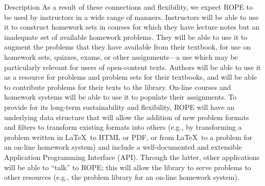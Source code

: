 \documentclass[11pt]{article}
\begin{document}
\begin{section}{Description}
As a result of these connections and flexibility, we expect ROPE to be
used by instructors in a wide range of manners.  Instructors will be able
to use it to construct homework sets in courses for which they have
lecture notes but an inadequate set of available homework problems.  They
will be able to use it to augment the problems that they have available
from their textbook, for use on homework sets, quizzes, exams, or other
assignments---a use which may be particularly relevant for users of
open-content texts.  Authors will be able to use it as a resource for
problems and problem sets for their textbooks, and will be able to
contribute problems for their texts to the library.  On-line courses and
homework systems will be able to use it to populate their assignments.  To
provide for its long-term sustainability and flexibility, ROPE will
have an underlying data structure that will allow the addition of new
problem formats and filters to transform existing formats into others
(e.g., by transforming a problem written in \LaTeX\ to HTML or PDF, or
from \LaTeX\ to a problem for an on-line homework system) and include a
well-documented and extensible Application Programming Interface
(API). Through the latter, other applications will be able to ``talk'' to
ROPE; this will allow the library to serve problems to other resources
(e.g., the problem library for an on-line homework system).

\end{section}
\end{document}
